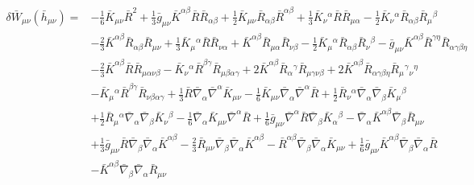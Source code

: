 \documentclass[10pt,letterpaper]{article}
\begin{document}
\begin{align}
\delta \bar W_{\mu\nu}(\bar h_{\mu\nu})={}&- \tfrac{1}{6} \bar K_{\mu \nu} \bar R^2
 + \tfrac{1}{3} \bar g_{\mu \nu} \bar K^{\alpha \beta} \bar R \bar R_{\alpha \beta}
 + \tfrac{1}{2} \bar K_{\mu \nu} \bar R_{\alpha \beta} \bar R^{\alpha \beta}
 + \tfrac{1}{3} \bar K_{\nu}{}^{\alpha} \bar R \bar R_{\mu \alpha}
 -  \tfrac{1}{2} \bar K_{\nu}{}^{\alpha} \bar R_{\alpha \beta} \bar R_{\mu}{}^{\beta}\nonumber\\
& -  \tfrac{2}{3} \bar K^{\alpha \beta} \bar R_{\alpha \beta} \bar R_{\mu \nu}
 + \tfrac{1}{3} \bar K_{\mu}{}^{\alpha} \bar R \bar R_{\nu \alpha}
 + \bar K^{\alpha \beta} \bar R_{\mu \alpha} \bar R_{\nu \beta}
 -  \tfrac{1}{2} \bar K_{\mu}{}^{\alpha} \bar R_{\alpha \beta} \bar R_{\nu}{}^{\beta}
 -  \bar g_{\mu \nu} \bar K^{\alpha \beta} \bar R^{\gamma \eta} \bar R_{\alpha \gamma \beta \eta}\nonumber\\
& -  \tfrac{2}{3} \bar K^{\alpha \beta} \bar R \bar R_{\mu \alpha \nu \beta}
 -  \bar K_{\nu}{}^{\alpha} \bar R^{\beta \gamma} \bar R_{\mu \beta \alpha \gamma}
 + 2 \bar K^{\alpha \beta} \bar R_{\alpha}{}^{\gamma} \bar R_{\mu \gamma \nu \beta}
 + 2 \bar K^{\alpha \beta} \bar R_{\alpha \gamma \beta \eta} \bar R_{\mu}{}^{\gamma}{}_{\nu}{}^{\eta}\nonumber\\
& -  \bar K_{\mu}{}^{\alpha} \bar R^{\beta \gamma} \bar R_{\nu \beta \alpha \gamma}
 + \tfrac{1}{3} \bar R \bar\nabla_{\alpha}\bar\nabla^{\alpha}\bar K_{\mu \nu}
 -  \tfrac{1}{6} \bar K_{\mu \nu} \bar\nabla_{\alpha}\bar\nabla^{\alpha}\bar R
 + \tfrac{1}{2} \bar R_{\nu}{}^{\alpha} \bar\nabla_{\alpha}\bar\nabla_{\beta}\bar K_{\mu}{}^{\beta}\nonumber\\
& + \tfrac{1}{2} \bar R_{\mu}{}^{\alpha} \bar\nabla_{\alpha}\bar\nabla_{\beta}\bar K_{\nu}{}^{\beta}
 -  \tfrac{1}{6} \bar\nabla_{\alpha}\bar K_{\mu \nu} \bar\nabla^{\alpha}\bar R
 + \tfrac{1}{6} \bar g_{\mu \nu} \bar\nabla^{\alpha}\bar R \bar\nabla_{\beta}\bar K_{\alpha}{}^{\beta}
 -  \bar\nabla_{\alpha}\bar K^{\alpha \beta} \bar\nabla_{\beta}\bar R_{\mu \nu}\nonumber\\
& + \tfrac{1}{3} \bar g_{\mu \nu} \bar R \bar\nabla_{\beta}\bar\nabla_{\alpha}\bar K^{\alpha \beta}
 -  \tfrac{2}{3} \bar R_{\mu \nu} \bar\nabla_{\beta}\bar\nabla_{\alpha}\bar K^{\alpha \beta}
 -  \bar R^{\alpha \beta} \bar\nabla_{\beta}\bar\nabla_{\alpha}\bar K_{\mu \nu}
 + \tfrac{1}{6} \bar g_{\mu \nu} \bar K^{\alpha \beta} \bar\nabla_{\beta}\bar\nabla_{\alpha}\bar R\nonumber\\
& -  \bar K^{\alpha \beta} \bar\nabla_{\beta}\bar\nabla_{\alpha}\bar R_{\mu \nu}

\end{align}
\end{document}
